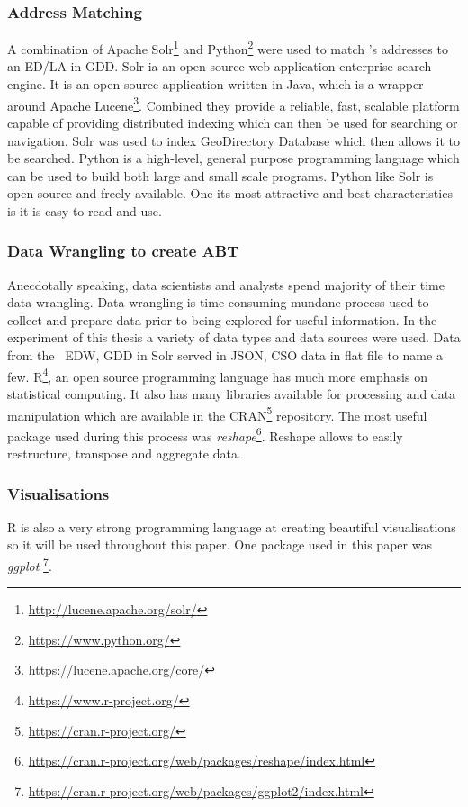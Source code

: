 \subsubsection{Address Matching}
A combination of Apache Solr\footnote{\url{http://lucene.apache.org/solr/}} and Python\footnote{\url{https://www.python.org/}} were used to match \subjectname's addresses to an ED/LA in GDD. Solr ia an open source web application enterprise search engine. It is an open source application written in Java, which is a wrapper around Apache Lucene\footnote{{\url{https://lucene.apache.org/core/}}}. Combined they provide a reliable, fast, scalable platform capable of providing distributed indexing which can then be used for searching or navigation. Solr was used to index GeoDirectory Database which then allows it to be searched. Python is a high-level, general purpose programming language which can be used to build both large and small scale programs. Python like Solr is open source and freely available. One its most attractive and best characteristics is it is easy to read and use.

\subsubsection{Data Wrangling to create ABT}
Anecdotally speaking, data scientists and analysts spend majority of their time data wrangling. Data wrangling is time consuming mundane process used to collect and prepare data prior to being explored for useful information. In the experiment of this thesis a variety of data types and data sources were used. Data from the \subjectname\ EDW, GDD in Solr served in JSON, CSO data in flat file to name a few. R\footnote{{\url{https://www.r-project.org/}}}, an open source programming language has much more emphasis on statistical computing. It also has many libraries available for processing and data manipulation which are available in the CRAN\footnote{{\url{https://cran.r-project.org/}}} repository. The most useful package used during this process was \textit{reshape}\footnote{{\url{https://cran.r-project.org/web/packages/reshape/index.html}}}. Reshape allows to easily restructure, transpose and aggregate data.

\subsubsection{Visualisations}
R is also a very strong programming language at creating beautiful visualisations so it will be used throughout this paper. One package used in this paper was \textit{ggplot}
\footnote{{\url{https://cran.r-project.org/web/packages/ggplot2/index.html}}}. 

